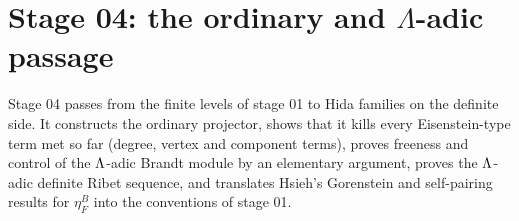 \section*{Stage 04: the ordinary and \texorpdfstring{$\Lambda$}{Lambda}-adic passage}\label{sec:stage-04}

Stage 04 passes from the finite levels of stage 01 to Hida families on the definite side. It constructs the ordinary
projector, shows that it kills every Eisenstein-type term met so far (degree, vertex and component terms), proves
freeness and control of the $\Lambda$-adic Brandt module by an elementary argument, proves the $\Lambda$-adic definite Ribet
sequence, and translates Hsieh's Gorenstein and self-pairing results for $\eta^B_F$ into the conventions of stage 01.


